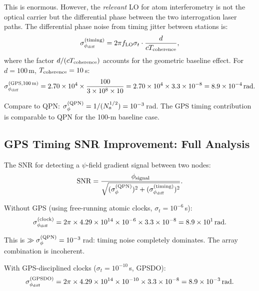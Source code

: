 \documentclass[11pt]{article}
\theoremstyle{definition}
\theoremstyle{remark}
\begin{document}
This is enormous. However, the \emph{relevant} LO for atom interferometry
is not the optical carrier but the differential phase between the two
interrogation laser paths. The differential phase noise from timing jitter
between stations is:
\begin{equation}
\sigma_{\phi_{\rm diff}}^{(\rm timing)}
= 2\pi f_{\rm LO} \sigma_t \cdot \frac{d}{c T_{\rm coherence}},
\label{eq:phase-diff-timing}
\end{equation}
where the factor $d/(c T_{\rm coherence})$ accounts for the geometric
baseline effect. For $d = 100$\,m, $T_{\rm coherence} = 10$\,s:
\begin{equation}
\sigma_{\phi_{\rm diff}}^{(\rm GPS, 100\,m)}
= 2.70\times10^4 \times \frac{100}{3\times10^8 \times 10}
= 2.70\times10^4 \times 3.3\times10^{-8}
= 8.9\times10^{-4}\,\mathrm{rad}.
\end{equation}

Compare to QPN: $\sigma_\phi^{(\rm QPN)} = 1/(N_a^{1/2}) = 10^{-3}$\,rad.
The GPS timing contribution is comparable to QPN for the 100-m baseline case.

\subsection{GPS Timing SNR Improvement: Full Analysis}

The SNR for detecting a $\psi$-field gradient signal between two nodes:
\begin{equation}
\mathrm{SNR} = \frac{\phi_{\rm signal}}{\sqrt{(\sigma_\phi^{(\rm QPN)})^2 + (\sigma_{\phi_{\rm diff}}^{(\rm timing)})^2}}.
\end{equation}

Without GPS (using free-running atomic clocks, $\sigma_t = 10^{-6}$\,s):
\begin{equation}
\sigma_{\phi_{\rm diff}}^{(\rm clock)}
= 2\pi \times 4.29\times10^{14} \times 10^{-6} \times 3.3\times10^{-8}
= 8.9\times10^{1}\,\mathrm{rad}.
\end{equation}

This is $\gg \sigma_\phi^{(\rm QPN)} = 10^{-3}$\,rad: timing noise
completely dominates. The array combination is incoherent.

With GPS-disciplined clocks ($\sigma_t = 10^{-10}$\,s, GPSDO):
\begin{equation}
\sigma_{\phi_{\rm diff}}^{(\rm GPSDO)}
= 2\pi \times 4.29\times10^{14} \times 10^{-10} \times 3.3\times10^{-8}
= 8.9\times10^{-3}\,\mathrm{rad}.
\end{equation}
\end{document}
